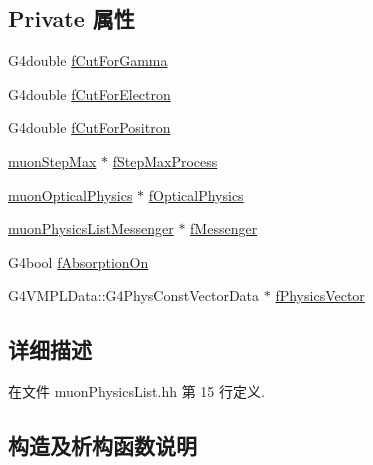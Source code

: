 \subsection*{Private 属性}
\begin{DoxyCompactItemize}
\item 
G4double \hyperlink{classmuonPhysicsList_a189c466de48a829bd0268f913e1df354}{f\+Cut\+For\+Gamma}
\item 
G4double \hyperlink{classmuonPhysicsList_a665c10013e65c9d8355ffc0b5f9f83ff}{f\+Cut\+For\+Electron}
\item 
G4double \hyperlink{classmuonPhysicsList_a486ede4ca7f533a83fb35d47301407f3}{f\+Cut\+For\+Positron}
\item 
\hyperlink{classmuonStepMax}{muon\+Step\+Max} $\ast$ \hyperlink{classmuonPhysicsList_a912f1109082e28c27ee5eecd492fe004}{f\+Step\+Max\+Process}
\item 
\hyperlink{classmuonOpticalPhysics}{muon\+Optical\+Physics} $\ast$ \hyperlink{classmuonPhysicsList_acb5e214bd52e011594ae48fcc42f0e34}{f\+Optical\+Physics}
\item 
\hyperlink{classmuonPhysicsListMessenger}{muon\+Physics\+List\+Messenger} $\ast$ \hyperlink{classmuonPhysicsList_a98210b7e2a5079480a973fbff5287187}{f\+Messenger}
\item 
G4bool \hyperlink{classmuonPhysicsList_acff98cc9ae946f83bcb9e3b0d6ceefc6}{f\+Absorption\+On}
\item 
G4\+V\+M\+P\+L\+Data\+::\+G4\+Phys\+Const\+Vector\+Data $\ast$ \hyperlink{classmuonPhysicsList_a6c077ba5278ee28a73980a27ec2feab9}{f\+Physics\+Vector}
\end{DoxyCompactItemize}


\subsection{详细描述}


在文件 muon\+Physics\+List.\+hh 第 15 行定义.



\subsection{构造及析构函数说明}
\mbox{\label{classmuonPhysicsList_aec1adc0f09839b739713b95b60a3433c}} 
